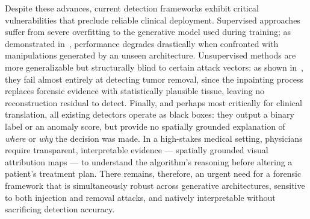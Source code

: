 \documentclass[sigconf, screen, review, anonymous]{acmart}
\begin{document}
Despite these advances, current detection frameworks exhibit critical vulnerabilities that preclude reliable clinical deployment. Supervised approaches suffer from severe overfitting to the generative model used during training; as demonstrated in~\cite{zingarini2024m3dsynth}, performance degrades drastically when confronted with manipulations generated by an unseen architecture. Unsupervised methods are more generalizable but structurally blind to certain attack vectors: as shown in~\cite{grabovski2025back}, they fail almost entirely at detecting tumor removal, since the inpainting process replaces forensic evidence with statistically plausible tissue, leaving no reconstruction residual to detect. Finally, and perhaps most critically for clinical translation, all existing detectors operate as black boxes: they output a binary label or an anomaly score, but provide no spatially grounded explanation of \emph{where} or \emph{why} the decision was made. In a high-stakes medical setting, physicians require transparent, interpretable evidence --- spatially grounded visual attribution maps --- to understand the algorithm's reasoning before altering a patient's treatment plan\cite{pradepan2025comprehensive, kaleta2025jointdiffusion}. There remains, therefore, an urgent need for a forensic framework that is simultaneously robust across generative architectures, sensitive to both injection and removal attacks, and natively interpretable without sacrificing detection accuracy.\\
\end{document}
